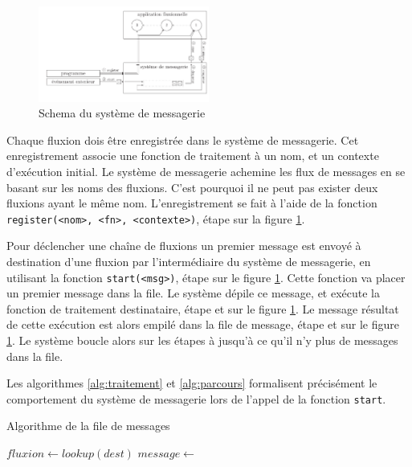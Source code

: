 \begin{figure}[h!]
  \includegraphics[width=0.5\textwidth]{schema-message.pdf}
  \caption{Schema du système de messagerie}
  \label{fig:messagerie}
\end{figure}

Chaque fluxion dois être enregistrée dans le système de messagerie.
Cet enregistrement associe une fonction de traitement à un nom, et un contexte d'exécution initial.
Le système de messagerie achemine les flux de messages en se basant sur les noms des fluxions.
C'est pourquoi il ne peut pas exister deux fluxions ayant le même nom.
L'enregistrement se fait à l'aide de la fonction \texttt{register(<nom>, <fn>, <contexte>)}, étape  sur la figure \ref{fig:messagerie}.

Pour déclencher une chaîne de fluxions un premier message est envoyé à destination d'une fluxion par l'intermédiaire du système de messagerie, en utilisant la fonction \texttt{start(<msg>)}, étape  sur le figure \ref{fig:messagerie}.
Cette fonction va placer un premier message dans la file.
Le système dépile ce message, et exécute la fonction de traitement destinataire, étape  et  sur le figure \ref{fig:messagerie}.
Le message résultat de cette exécution est alors empilé dans la file de message, étape  et  sur le figure \ref{fig:messagerie}.
Le système boucle alors sur les étapes  à  jusqu'à ce qu'il n'y plus de messages dans la file.

Les algorithmes \ref{alg:traitement} et \ref{alg:parcours} formalisent précisément le comportement du système de messagerie lors de l'appel de la fonction \texttt{start}.

\begin{algorithm}
\caption{Algorithme de la file de messages}
\label{alg:traitement}
\begin{algorithmic}
\State $fluxion \gets lookup(dest)$
\State $message \gets$  
\State {} 
\EndFor
\EndFunction
\end{algorithmic}
\end{algorithm}

